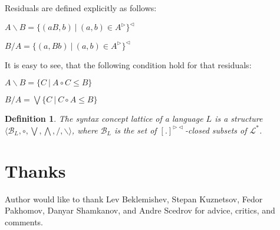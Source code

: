 \documentclass[a4paper]{article}
\theoremstyle{defin}
\newtheorem{defin}{Definition}
\theoremstyle{theorem}
\theoremstyle{prop}
\theoremstyle{lemma}
\theoremstyle{ex}
\theoremstyle{col}
\begin{document}
Residuals are defined explicitly as follows:

\begin{center}
  $A \backslash B = \{ (a B, b) \: | \: (a, b) \in A^{\triangleright} \}^{\triangleleft}$

  $B / A = \{ (a, B b) \: | \: (a, b) \in A^{\triangleright} \}^{\triangleleft}$
\end{center}

It is easy to see, that the following condition hold for that residuals:

\begin{center}
  $A \backslash B = \{ C \: | \: A \circ C \leq B \}$

  $B / A = \bigvee \{ C \: | \: C \circ A \leq B \}$
\end{center}

\begin{defin}
  The syntax concept lattice of a language $L$ is a structure $\langle \mathcal{B}_{L}, \circ, \bigvee, \bigwedge, /,
  \backslash \rangle$, where $\mathcal{B}_{L}$ is the set of $[.]^{\triangleright \triangleleft}$-closed subsets of
  $\mathcal{L}^{*}$.
\end{defin}

\section{Thanks}

Author would like to thank Lev Beklemishev, Stepan Kuznetsov, Fedor Pakhomov, Danyar Shamkanov, and Andre Scedrov
for advice, critics, and comments.
\end{document}
